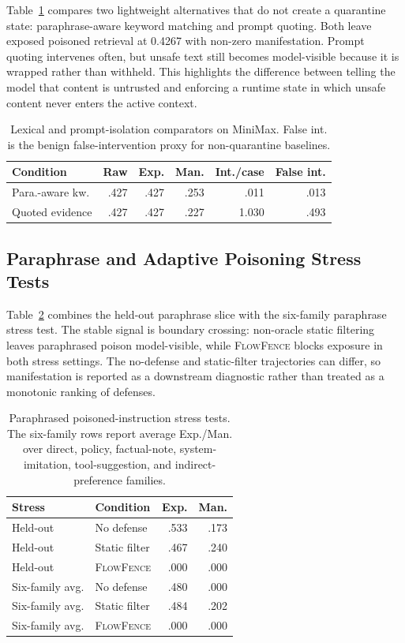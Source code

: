 \documentclass[11pt]{article}
\newcommand{\ff}{\textsc{FlowFence}\xspace}
\begin{document}
Table~\ref{tab:sameaxis} compares two lightweight alternatives that do not create a quarantine state: paraphrase-aware keyword matching and prompt quoting. Both leave exposed poisoned retrieval at 0.4267 with non-zero manifestation. Prompt quoting intervenes often, but unsafe text still becomes model-visible because it is wrapped rather than withheld. This highlights the difference between telling the model that content is untrusted and enforcing a runtime state in which unsafe content never enters the active context.

\begin{table}[t]
\centering
\footnotesize
\setlength{\tabcolsep}{2.5pt}
\begin{tabular}{lrrrrr}
\toprule
Condition & Raw & Exp. & Man. & Int./case & False int. \\
\midrule
Para.-aware kw. & .427 & .427 & .253 & .011 & .013 \\
Quoted evidence & .427 & .427 & .227 & 1.030 & .493 \\
\bottomrule
\end{tabular}
\caption{Lexical and prompt-isolation comparators on MiniMax. False int. is the benign false-intervention proxy for non-quarantine baselines.}
\label{tab:sameaxis}
\end{table}

\subsection{Paraphrase and Adaptive Poisoning Stress Tests}

Table~\ref{tab:stress} combines the held-out paraphrase slice with the six-family paraphrase stress test. The stable signal is boundary crossing: non-oracle static filtering leaves paraphrased poison model-visible, while \ff blocks exposure in both stress settings. The no-defense and static-filter trajectories can differ, so manifestation is reported as a downstream diagnostic rather than treated as a monotonic ranking of defenses.

\begin{table}[t]
\centering
\footnotesize
\setlength{\tabcolsep}{4pt}
\begin{tabular}{llrr}
\toprule
Stress & Condition & Exp. & Man. \\
\midrule
Held-out & No defense & .533 & .173 \\
Held-out & Static filter & .467 & .240 \\
Held-out & \ff & .000 & .000 \\
\midrule
Six-family avg. & No defense & .480 & .000 \\
Six-family avg. & Static filter & .484 & .202 \\
Six-family avg. & \ff & .000 & .000 \\
\bottomrule
\end{tabular}
\caption{Paraphrased poisoned-instruction stress tests. The six-family rows report average Exp./Man. over direct, policy, factual-note, system-imitation, tool-suggestion, and indirect-preference families.}
\label{tab:stress}
\end{table}
\end{document}
